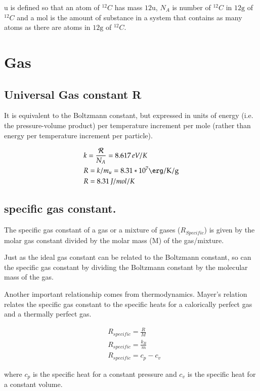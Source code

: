 \documentclass[main.tex]{subfiles}
\begin{document}
\si{\atomicmassunit} is defined so that an atom of $^{12}C$ has mass $12 \si{\atomicmassunit}$, $N_A$ is number of $^{12}C$ in $12 \si{\gram}$ of $^{12}C$ and a \si{\mole} is the amount of substance in a system that contains as many atoms as there are atoms in $12\si{\gram}$ of $^{12}C$.

\section{Gas}

\subsection{Universal Gas constant R}

It is equivalent to the Boltzmann constant, but expressed in units of energy (i.e. the pressure-volume product) per temperature increment per mole (rather than energy per temperature increment per particle).

\begin{align*}
&k=\frac{\gasconstant{}}{N_A}=8.617\,eV/K\\
&R=k/m_u=8.31*10^7 \si{\erg\per\kelvin\per\gram}\\
&R=8.31\,J/mol/K
\end{align*}

\subsection{specific gas constant.}

The specific gas constant of a gas or a mixture of gases ($R_{Specific}$) is given by the molar gas constant divided by the molar mass (M) of the gas/mixture.

Just as the ideal gas constant can be related to the Boltzmann constant, so can the specific gas constant by dividing the Boltzmann constant by the molecular mass of the gas.

Another important relationship comes from thermodynamics. Mayer's relation relates the specific gas constant to the specific heats for a calorically perfect gas and a thermally perfect gas.

\begin{align*}
&R_{specific} = \frac{R}{M}\\
&R_{specific} = \frac{{k_{B}}}{m}\\
&R_{specific} = c_p - c_v
\end{align*}

where $c_p$ is the specific heat for a constant pressure and $c_v$ is the specific heat for a constant volume.
\end{document}
